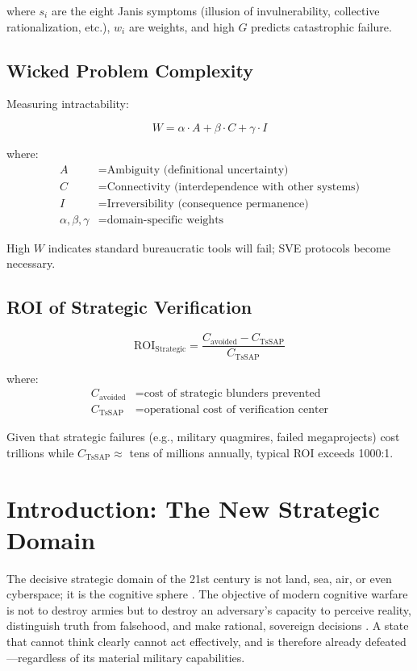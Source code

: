 \documentclass[11pt,a4paper]{article}
\begin{document}
where $s_i$ are the eight Janis symptoms (illusion of invulnerability, collective rationalization, etc.), $w_i$ are weights, and high $G$ predicts catastrophic failure.

\subsection*{Wicked Problem Complexity}
Measuring intractability:

\begin{equation}
W = \alpha \cdot A + \beta \cdot C + \gamma \cdot I
\label{eq:wicked}
\end{equation}

where:
\begin{align*}
A &= \text{Ambiguity (definitional uncertainty)} \\
C &= \text{Connectivity (interdependence with other systems)} \\
I &= \text{Irreversibility (consequence permanence)} \\
\alpha, \beta, \gamma &= \text{domain-specific weights}
\end{align*}

\noindent High $W$ indicates standard bureaucratic tools will fail; SVE protocols become necessary.

\subsection*{ROI of Strategic Verification}
\begin{equation}
\text{ROI}_{\text{Strategic}} = \frac{C_{\text{avoided}} - C_{\text{TsSAP}}}{C_{\text{TsSAP}}}
\label{eq:roi_strategic}
\end{equation}

where:
\begin{align*}
C_{\text{avoided}} &= \text{cost of strategic blunders prevented} \\
C_{\text{TsSAP}} &= \text{operational cost of verification center}
\end{align*}

\noindent Given that strategic failures (e.g., military quagmires, failed megaprojects) cost trillions while $C_{\text{TsSAP}} \approx$ tens of millions annually, typical ROI exceeds 1000:1.

\vspace{0.5cm}
\clearpage
\setcounter{page}{1}

\section{Introduction: The New Strategic Domain}
The decisive strategic domain of the 21st century is not land, sea, air, or even cyberspace; it is the cognitive sphere \citep[lines 624--625, 1350--1351]{AnalyticalReport2025}. The objective of modern cognitive warfare is not to destroy armies but to destroy an adversary's capacity to perceive reality, distinguish truth from falsehood, and make rational, sovereign decisions \citep[lines 624--625]{AnalyticalReport2025}. A state that cannot think clearly cannot act effectively, and is therefore already defeated—regardless of its material military capabilities.
\end{document}
